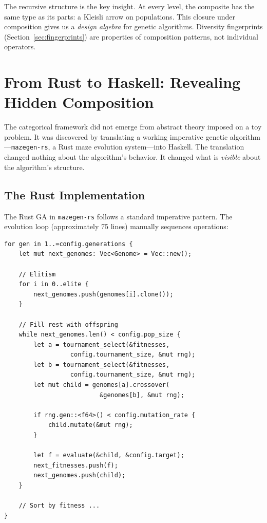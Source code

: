 \documentclass[dvipsnames,format=sigconf,anonymous=false,review=false]{acmart}
\begin{document}
The recursive structure is the key insight. At every level, the composite has the same type as its parts: a Kleisli arrow on populations. This closure under composition gives us a \emph{design algebra} for genetic algorithms. Diversity fingerprints (Section~\ref{sec:fingerprints}) are properties of composition patterns, not individual operators.

\section{From Rust to Haskell: Revealing Hidden Composition}

The categorical framework did not emerge from abstract theory imposed on a toy problem. It was discovered by translating a working imperative genetic algorithm---\texttt{mazegen-rs}, a Rust maze evolution system---into Haskell. The translation changed nothing about the algorithm's behavior. It changed what is \emph{visible} about the algorithm's structure.

\subsection{The Rust Implementation}

The Rust GA in \texttt{mazegen-rs} follows a standard imperative pattern. The evolution loop (approximately 75 lines) manually sequences operations:

\begin{lstlisting}[style=ruststyle]
for gen in 1..=config.generations {
    let mut next_genomes: Vec<Genome> = Vec::new();

    // Elitism
    for i in 0..elite {
        next_genomes.push(genomes[i].clone());
    }

    // Fill rest with offspring
    while next_genomes.len() < config.pop_size {
        let a = tournament_select(&fitnesses,
                  config.tournament_size, &mut rng);
        let b = tournament_select(&fitnesses,
                  config.tournament_size, &mut rng);
        let mut child = genomes[a].crossover(
                          &genomes[b], &mut rng);

        if rng.gen::<f64>() < config.mutation_rate {
            child.mutate(&mut rng);
        }

        let f = evaluate(&child, &config.target);
        next_fitnesses.push(f);
        next_genomes.push(child);
    }

    // Sort by fitness ...
}
\end{lstlisting}
\end{document}
